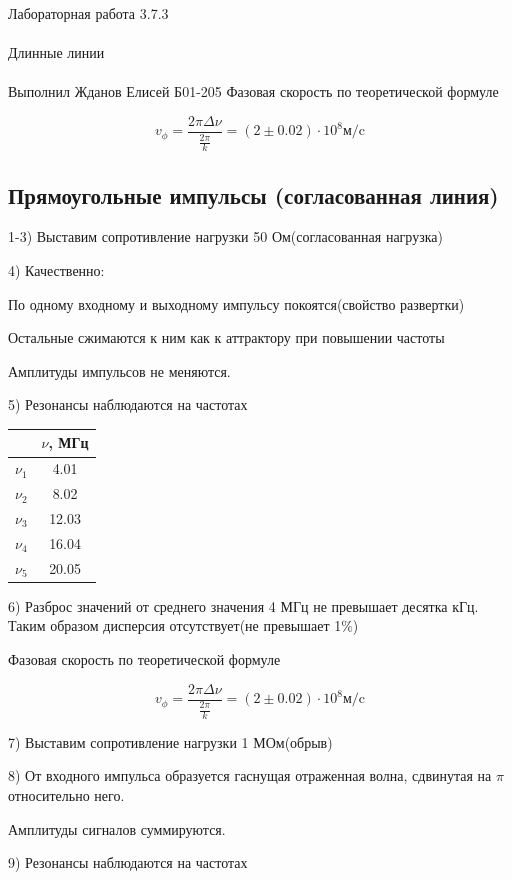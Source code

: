 \documentclass{astroedu-lab}
\begin{document}
\begin{problem}{\huge Лабораторная работа 3.7.3\\\\Длинные линии\\\\Выполнил Жданов Елисей Б01-205}
Фазовая скорость по теоретической формуле

\begin{equation}
	v_\phi = \frac{2 \pi \Delta \nu}{\frac{2 \pi}{k}} = (2 \pm 0.02) \cdot 10^8 \text{м/c}
\end{equation}

\subsection{Прямоугольные импульсы (согласованная линия)}

1-3) Выставим сопротивление нагрузки 50 Ом(согласованная нагрузка)

4) Качественно:

По одному входному и выходному импульсу покоятся(свойство развертки)

Остальные сжимаются к ним как к аттрактору при повышении частоты

Амплитуды импульсов не меняются.

5) Резонансы наблюдаются на частотах

\begin{center}
\begin{tabular}{|c|c|}
\hline 
& $\nu$, МГц \\
\hline
$\nu_1$ & 4.01 \\
$\nu_2$ & 8.02 \\
$\nu_3$ & 12.03 \\
$\nu_4$ & 16.04 \\
$\nu_5$ & 20.05 \\
\hline
\end{tabular}
\end{center}

6) Разброс значений от среднего значения 4 МГц не превышает десятка кГц. Таким образом дисперсия отсутствует(не превышает 1$\%$)

Фазовая скорость по теоретической формуле

\begin{equation}
	v_\phi = \frac{2 \pi \Delta \nu}{\frac{2 \pi}{k}} = (2 \pm 0.02) \cdot 10^8 \text{м/c}
\end{equation}

7) Выставим сопротивление нагрузки 1 МОм(обрыв)

8) От входного импульса образуется гаснущая отраженная волна, сдвинутая на $\pi$ относительно него.

Амплитуды сигналов суммируются.

9) Резонансы наблюдаются на частотах


\end{problem}
\end{document}
